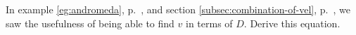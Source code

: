 In example \ref{eg:andromeda}, p.~\pageref{eg:andromeda}, and
section \ref{subsec:combination-of-vel}, p.~\pageref{subsec:combination-of-vel},
we saw the usefulness of being able to find $v$ in terms of $D$.
Derive this equation.\answercheck
